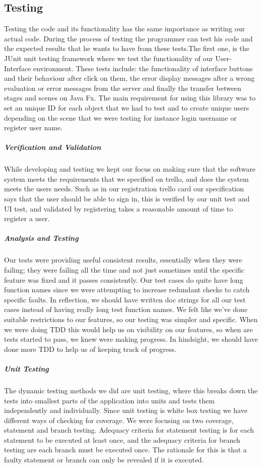 \documentclass[11pt,a4paper]{report}
\begin{document}
\subsection{Testing}
Testing the code and its functionality has the same importance as writing our actual code. During the process of testing the programmer can test his code and the expected results that he wants to have from these tests.The first one, is the JUnit unit testing framework where we test the functionality of our User-Interface environment. These tests include: the functionality of interface buttons and their behaviour after click on them, the error display messages after a wrong evaluation or error messages from the server and finally the transfer between stages and scenes on Java Fx. The main requirement for using this library was to set an unique ID for each object that we had to test and to create unique users depending on the scene that we were testing for instance login username or register user name.

\subparagraph{Verification and Validation}
While developing and testing we kept our focus on making sure that the software system meets the requirements that we specified on trello, and does the system meets the users needs. Such as in our registration trello card our specification says that the user should be able to sign in, this is verified by our unit test and UI test, and validated by registering takes a reasonable amount of time to register a user.

\subparagraph{Analysis and Testing}
Our tests were providing useful consistent results, essentially when they were failing; they were failing all the time and not just sometimes until the specific feature was fixed and it passes consistently. Our test cases do quite have long function names since we were attempting to increase redundant checks to catch specific faults. In reflection, we should have written doc strings for all our test cases instead of having really long test function names. We felt like we’ve done suitable restrictions to our features, so our testing was simpler and specific. When we were doing TDD this would help us on visibility on our features, so when are tests started to pass, we knew were making progress. In hindsight, we should have done more TDD to help us of keeping track of progress.


\subparagraph{Unit Testing} The dynamic testing methods we did are unit testing, where this breaks down the tests into smallest parts of the application into units and tests them independently and individually. Since unit testing is white box testing we have different ways of checking for coverage. We were focusing on two coverage, statement and branch testing. Adequacy criteria for statement testing is for each statement to be executed at least once, and the adequacy criteria for branch testing are each branch must be executed once. The rationale for this is that a faulty statement or branch can only be revealed if it is executed.
\end{document}
